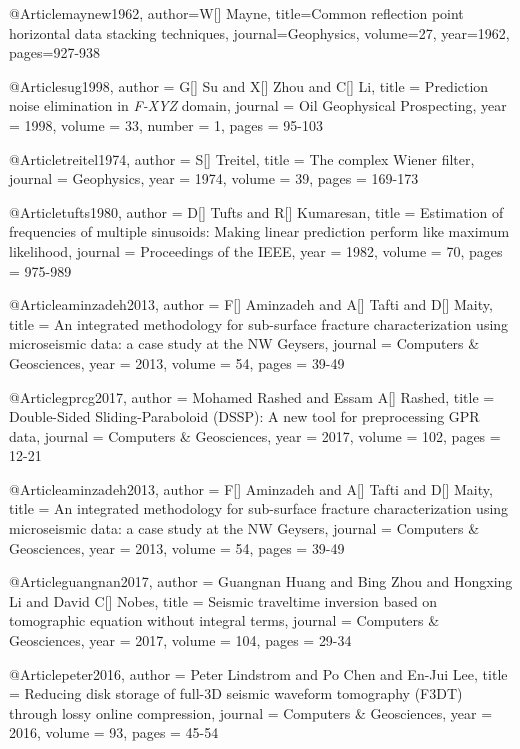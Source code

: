 @Article{maynew1962,
author={W[] Mayne},
title={Common reflection point horizontal data stacking techniques},
journal={Geophysics},
volume=27,
year=1962,
pages={927-938}
}

@Article{sug1998,
  author = 	 {G[] Su and X[] Zhou and C[] Li},
  title = 	 { Prediction noise elimination in \emph{F-XYZ} domain},
  journal = 	 { Oil Geophysical Prospecting},
  year = 	 1998,
  volume = 	 33,
  number = 	 1,
  pages = 	 {95-103}}

@Article{treitel1974,
  author = 	 {S[] Treitel},
  title = 	 {The complex Wiener filter},
  journal = 	 { Geophysics},
  year = 	 1974,
  volume = 	 39,
  pages = 	 {169-173}}

@Article{tufts1980,
  author = 	 {D[] Tufts and R[] Kumaresan},
  title = 	 {Estimation of frequencies of multiple sinusoids: Making linear prediction perform like maximum likelihood},
  journal = 	 { Proceedings of the IEEE},
  year = 	 1982,
  volume = 	 70,
  pages = 	 {975-989}}

@Article{aminzadeh2013,
  author = 	 {F[] Aminzadeh and A[] Tafti and D[] Maity},
  title = 	 {An integrated methodology for sub-surface fracture characterization using microseismic data: a case study at the NW {G}eysers},
  journal = 	 { Computers \& Geosciences},
  year = 	 2013,
  volume = 	 54,
  pages = 	 {39-49}}

@Article{gprcg2017,
  author = 	 {Mohamed Rashed and Essam A[] Rashed},
  title = 	 {Double-Sided Sliding-Paraboloid (DSSP): A new tool for preprocessing GPR data},
  journal = 	 { Computers \& Geosciences},
  year = 	 2017,
  volume = 	 102,
  pages = 	 {12-21}}
  
@Article{aminzadeh2013,
  author = 	 {F[] Aminzadeh and A[] Tafti and D[] Maity},
  title = 	 {An integrated methodology for sub-surface fracture characterization using microseismic data: a case study at the NW {G}eysers},
  journal = 	 { Computers \& Geosciences},
  year = 	 2013,
  volume = 	 54,
  pages = 	 {39-49}}
  
 @Article{guangnan2017,
  author = 	 {Guangnan Huang and Bing Zhou and Hongxing Li and David C[] Nobes},
  title = 	 {Seismic traveltime inversion based on tomographic equation without integral terms},
  journal = 	 { Computers \& Geosciences},
  year = 	 2017,
  volume = 	 104,
  pages = 	 {29-34}} 

 @Article{peter2016,
  author = 	 {Peter Lindstrom and Po Chen and En-Jui Lee},
  title = 	 {Reducing disk storage of full-3{D} seismic waveform tomography ({F3DT}) through lossy online compression},
  journal = 	 { Computers \& Geosciences},
  year = 	 2016,
  volume = 	 93,
  pages = 	 {45-54}} 
  
